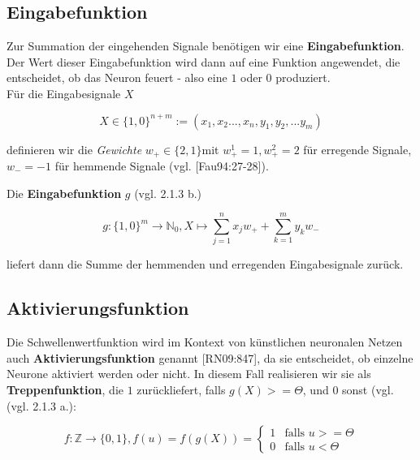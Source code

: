 \subsection*{Eingabefunktion}
Zur Summation der eingehenden Signale benötigen wir eine \textbf{Eingabefunktion}.
Der Wert dieser Eingabefunktion wird dann auf eine Funktion angewendet, die entscheidet, ob das Neuron feuert - also eine $1$ oder $0$ produziert.\\

\noindent
Für die Eingabesignale $X$

\begin{equation}
X \in \{1, 0\}^{n+m} := (x_1, x_2 ..., x_n, y_1, y_2, ... y_m)
\end{equation}\linebreak[2]

\noindent
definieren wir die \textit{Gewichte} $w_+ \in \{2, 1\}$\footnotemark[18] mit $w^1_+ =1, w^2_+ = 2$ für erregende Signale, $w_- = -1$ für hemmende Signale (vgl. [Fau94:27-28]).\\


\noindent
Die \textbf{Eingabefunktion} $g$ (vgl. 2.1.3 b.)

\begin{equation}
g: \{1, 0\}^m \to  \mathbb{N}_0, X \mapsto \sum^n_{j=1} x_jw_+ + \sum^m_{k=1} y_kw_-
\label{eq:gl-mcpinpfunc}
\end{equation}\linebreak[2]

\noindent
liefert dann die Summe der hemmenden und erregenden Eingabesignale zurück.


\subsection*{Aktivierungsfunktion}
Die Schwellenwertfunktion wird im Kontext von künstlichen neuronalen Netzen auch \textbf{Aktivierungsfunktion} genannt [RN09:847], da sie entscheidet, ob einzelne Neurone aktiviert werden oder nicht. In diesem Fall realisieren wir sie als \textbf{Treppenfunktion}, die $1$ zurückliefert, falls $g(X) >= \Theta$, und $0$ sonst  (vgl. (vgl. 2.1.3 a.):

\begin{equation}
f:  \mathbb{Z} \to \{0, 1\}, f(u) = f(g(X)) = \begin{cases}
                                          1  &\text{falls } u >= \Theta \\
                                          0 &\text{falls } u < \Theta
\end{cases}
\label{eq:gl-activation}
\end{equation}\linebreak[2]


